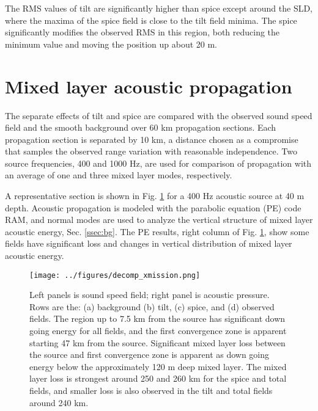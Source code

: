 \documentclass[preprint,NumberedRefs]{JASA}
\begin{document}
The RMS values of tilt are significantly higher than spice except around the SLD, where the maxima of the spice field is close to the tilt field minima. The spice significantly modifies the observed RMS in this region, both reducing the minimum value and moving the position up about 20 m.

\section{\label{sec:propagation}Mixed layer acoustic propagation}
The separate effects of tilt and spice are compared with the observed sound speed field and the smooth background over 60 km propagation sections. Each propagation section is separated by 10 km, a distance chosen as a compromise that samples the observed range variation with reasonable independence. Two source frequencies, 400 and 1000 Hz, are used for comparison of propagation with an average of one and three mixed layer modes, respectively.

A representative section is shown in Fig. \ref{fig:decomp_x} for a 400 Hz acoustic source at 40 m depth. Acoustic propagation is modeled with the parabolic equation (PE) code RAM\citep{collins93}, and normal modes are used to analyze the vertical structure of mixed layer acoustic energy, Sec. \ref{ssec:bg}. The PE results, right column  of Fig. \ref{fig:decomp_x}, show some fields have significant loss and changes in vertical distribution of mixed layer acoustic energy.

\begin{figure}
\texttt{[image: ../figures/decomp\_xmission.png]}
    \caption{\label{fig:decomp_x}{Left panels is sound speed field; right panel is acoustic pressure. Rows are the: (a) background (b) tilt, (c) spice, and (d) observed fields. The region up to 7.5 km from the source has significant down going energy for all fields, and the first convergence zone is apparent starting 47 km from the source. Significant mixed layer loss between the source and first convergence zone is apparent as down going energy below the approximately 120 m deep mixed layer. The mixed layer loss is strongest around 250 and 260 km for the spice and total fields, and smaller loss is also observed in the tilt and total fields around 240 km.}}
\end{figure}
\end{document}

